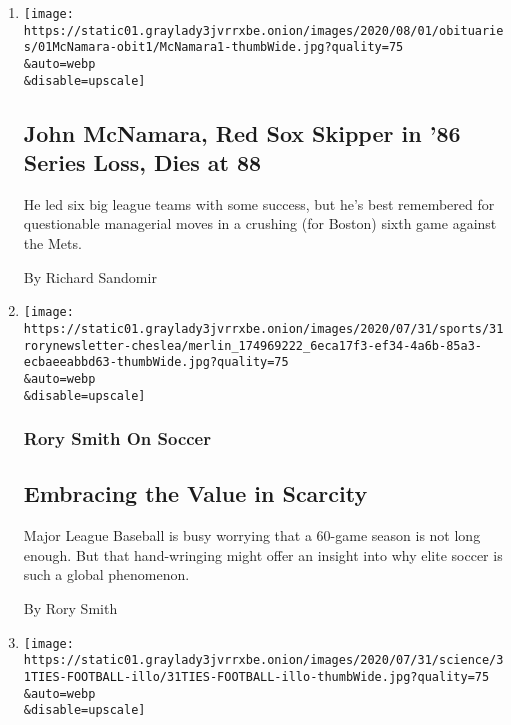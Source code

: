 \begin{enumerate}
\def\labelenumi{\arabic{enumi}.}
\item
  \href{/2020/07/31/sports/baseball/john-mcnamara-dead.html}{}

  \texttt{[image: https://static01.graylady3jvrrxbe.onion/images/2020/08/01/obituaries/01McNamara-obit1/McNamara1-thumbWide.jpg?quality=75\\\&auto=webp\\\&disable=upscale]}

  \hypertarget{john-mcnamara-red-sox-skipper-in-86-series-loss-dies-at-88}{%
  \subsection{John McNamara, Red Sox Skipper in '86 Series Loss, Dies at
  88}\label{john-mcnamara-red-sox-skipper-in-86-series-loss-dies-at-88}}

  He led six big league teams with some success, but he's best
  remembered for questionable managerial moves in a crushing (for
  Boston) sixth game against the Mets.

  By Richard Sandomir
\item
  \href{/2020/07/31/sports/soccer/soccer-baseball.html}{}

  \texttt{[image: https://static01.graylady3jvrrxbe.onion/images/2020/07/31/sports/31rorynewsletter-cheslea/merlin\_174969222\_6eca17f3-ef34-4a6b-85a3-ecbaeeabbd63-thumbWide.jpg?quality=75\\\&auto=webp\\\&disable=upscale]}

  \hypertarget{rory-smith-on-soccer}{%
  \subsubsection{Rory Smith On Soccer}\label{rory-smith-on-soccer}}

  \hypertarget{embracing-the-value-in-scarcity}{%
  \subsection{Embracing the Value in
  Scarcity}\label{embracing-the-value-in-scarcity}}

  Major League Baseball is busy worrying that a 60-game season is not
  long enough. But that hand-wringing might offer an insight into why
  elite soccer is such a global phenomenon.

  By Rory Smith
\item
  \href{/2020/07/31/well/family/gambling-on-college-football-almost-fixed-my-dysfunctional-family.html}{}

  \texttt{[image: https://static01.graylady3jvrrxbe.onion/images/2020/07/31/science/31TIES-FOOTBALL-illo/31TIES-FOOTBALL-illo-thumbWide.jpg?quality=75\\\&auto=webp\\\&disable=upscale]}


\end{enumerate}
